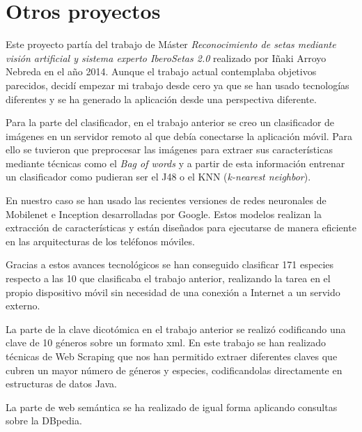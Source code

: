 

\section{Otros proyectos}

Este proyecto partía del trabajo de Máster \textit{Reconocimiento de setas mediante visión artificial y sistema experto IberoSetas 2.0} realizado por Iñaki Arroyo Nebreda en el año 2014. Aunque el trabajo actual contemplaba objetivos parecidos, decidí empezar mi trabajo desde cero ya que se han usado tecnologías diferentes y se ha generado la aplicación desde una perspectiva diferente. \cite{iberosetas}

Para la parte del clasificador, en el trabajo anterior se creo un clasificador de imágenes en un servidor remoto al que debía conectarse la aplicación móvil. Para ello se tuvieron que preprocesar las imágenes para extraer sus características mediante técnicas como el \textit{Bag of words} y a partir de esta información entrenar un clasificador como pudieran ser el J48 o el KNN (\textit{k-nearest neighbor}).

En nuestro caso se han usado las recientes versiones de redes neuronales de Mobilenet e Inception desarrolladas por Google. Estos modelos realizan la extracción de características y están diseñados para ejecutarse de manera eficiente en las arquitecturas de los teléfonos móviles.

Gracias a estos avances tecnológicos se han conseguido clasificar 171 especies respecto a las 10 que clasificaba el trabajo anterior, realizando la tarea en el propio dispositivo móvil sin necesidad de una conexión a Internet a un servido externo.

La parte de la clave dicotómica en el trabajo anterior se realizó codificando una clave de 10 géneros sobre un formato xml. En este trabajo se han realizado técnicas de Web Scraping que nos han permitido extraer diferentes claves que cubren un mayor número de géneros y especies, codificandolas directamente en estructuras de datos Java.

La parte de web semántica se ha realizado de igual forma aplicando consultas sobre la DBpedia.


